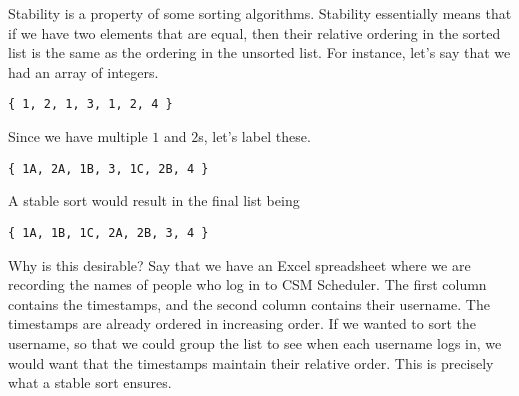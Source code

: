 \begin{blocksection}
Stability is a property of some sorting algorithms. Stability essentially means
that if we have two elements that are equal, then their relative ordering in
the sorted list is the same as the ordering in the unsorted list. For instance,
let's say that we had an array of integers.

\begin{verbatim}
{ 1, 2, 1, 3, 1, 2, 4 }
\end{verbatim}

Since we have multiple $1$ and $2$s, let's label these.

\begin{verbatim}
{ 1A, 2A, 1B, 3, 1C, 2B, 4 }
\end{verbatim}

A stable sort would result in the final list being

\begin{verbatim}
{ 1A, 1B, 1C, 2A, 2B, 3, 4 }
\end{verbatim}

Why is this desirable? Say that we have an Excel spreadsheet where we are
recording the names of people who log in to CSM Scheduler. The first column
contains the timestamps, and the second column contains their username. The
timestamps are already ordered in increasing order. If we wanted to sort the
username, so that we could group the list to see when each username logs in, we
would want that the timestamps maintain their relative order. This is precisely
what a stable sort ensures.
\end{blocksection}
